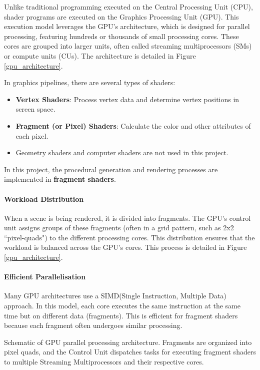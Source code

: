 Unlike traditional programming executed on the Central Processing Unit (CPU), shader programs are executed on the Graphics Processing Unit (GPU). This execution model leverages the GPU’s architecture, which is designed for parallel processing, featuring hundreds or thousands of small processing cores. These cores are grouped into larger units, often called streaming multiprocessors (SMs) or compute units (CUs). The architecture is detailed in Figure \ref{gpu_architecture}.

In graphics pipelines, there are several types of shaders:
\begin{itemize}
    \item \textbf{Vertex Shaders}: Process vertex data and determine vertex positions in screen space.
    \item \textbf{Fragment (or Pixel) Shaders}: Calculate the color and other attributes of each pixel.
    \item Geometry shaders and computer shaders are not used in this project.
\end{itemize}

In this project, the procedural generation and rendering processes are implemented in \textbf{fragment shaders}.

\paragraph{Workload Distribution}
When a scene is being rendered, it is divided into fragments. The GPU's control unit assigns groups of these fragments (often in a grid pattern, such as 2x2 ``pixel-quads") to the different processing cores. This distribution ensures that the workload is balanced across the GPU's cores. This process is detailed in Figure \ref{gpu_architecture}.

\paragraph{Efficient Parallelisation}
Many GPU architectures use a SIMD(Single Instruction, Multiple Data) approach. In this model, each core executes the same instruction at the same time but on different data (fragments). This is efficient for fragment shaders because each fragment often undergoes similar processing.

{Schematic of GPU parallel processing architecture. Fragments are organized into pixel quads, and the Control Unit dispatches tasks for executing fragment shaders to multiple Streaming Multiprocessors and their respective cores.}

